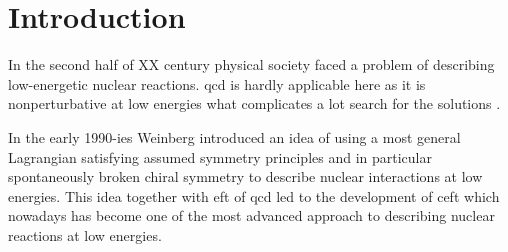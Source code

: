 \chapter{Introduction}
\label{introduction}


    
    
    
        
In the second half of XX century physical society faced
a problem of describing low-energetic nuclear reactions.
\gls*{qcd} is hardly applicable here as it is nonperturbative 
at low energies what complicates a lot search for the solutions \cite{Machleidt2011}. 

In the early 1990-ies Weinberg \cite{WEINBERG1990,WEINBERG1991} introduced 
an idea of using a most general Lagrangian
satisfying assumed symmetry principles and in particular
spontaneously broken chiral symmetry to 
describe nuclear interactions at low energies.
This idea together with \gls*{eft} of \gls*{qcd} 
led to the development of \gls*{ceft}
which nowadays has become one of the most advanced approach to
describing nuclear reactions at low energies.
 

